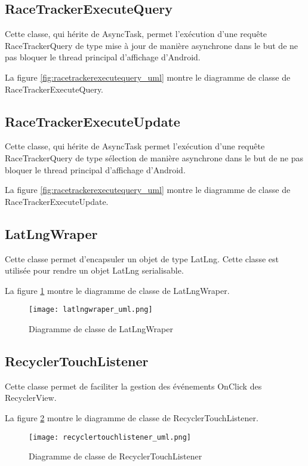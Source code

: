 \subsection{RaceTrackerExecuteQuery}

Cette classe, qui hérite de AsyncTask, permet l'exécution d'une requête RaceTrackerQuery de type mise à jour de manière asynchrone dans le but de ne pas bloquer le thread principal d'affichage d'Android.

La figure \ref{fig:racetrackerexecutequery_uml} montre le diagramme de classe de RaceTrackerExecuteQuery.

\subsection{RaceTrackerExecuteUpdate}

Cette classe, qui hérite de AsyncTask permet l'exécution d'une requête RaceTrackerQuery de type sélection de manière asynchrone dans le but de ne pas bloquer le thread principal d'affichage d'Android.

La figure \ref{fig:racetrackerexecutequery_uml} montre le diagramme de classe de RaceTrackerExecuteUpdate.

\subsection{LatLngWraper}

Cette classe permet d'encapsuler un objet de type LatLng. Cette classe est utilisée pour rendre un objet LatLng serialisable.

La figure \ref{fig:latlngwraper_uml} montre le diagramme de classe de LatLngWraper.

\begin{figure}[htb]
\centering 
\texttt{[image: latlngwraper\_uml.png]} 
\caption{Diagramme de classe de LatLngWraper}
\label{fig:latlngwraper_uml}
 \end{figure}

\subsection{RecyclerTouchListener}

Cette classe permet de faciliter la gestion des événements OnClick des RecyclerView.

La figure \ref{fig:recyclertouchlistener_uml} montre le diagramme de classe de RecyclerTouchListener.

\begin{figure}[htb]
\centering 
\texttt{[image: recyclertouchlistener\_uml.png]} 
\caption{Diagramme de classe de RecyclerTouchListener}
\label{fig:recyclertouchlistener_uml}
 \end{figure}

